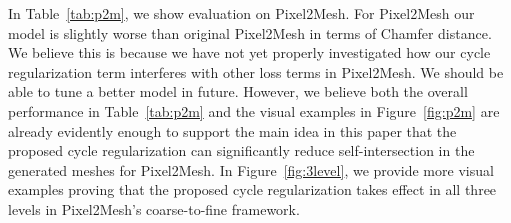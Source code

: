 In Table~\ref{tab:p2m}, we show evaluation on Pixel2Mesh. For Pixel2Mesh our model is slightly worse than original Pixel2Mesh in terms of Chamfer distance. We believe this is because we have not yet properly investigated how our cycle regularization term interferes with other loss terms in Pixel2Mesh. We should be able to tune a better model in future. However, we believe both the overall performance in Table~\ref{tab:p2m} and the visual examples in Figure~\ref{fig:p2m} are already evidently enough to support the main idea in this paper that the proposed cycle regularization can significantly reduce self-intersection in the generated meshes for Pixel2Mesh. In Figure~\ref{fig:3level}, we provide more visual examples proving that the proposed cycle regularization takes effect in all three levels in Pixel2Mesh's coarse-to-fine framework.

